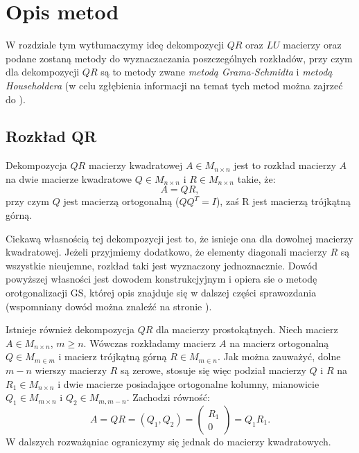 \section{Opis metod}
W rozdziale tym wytłumaczymy ideę dekompozycji $QR$ oraz $LU$ macierzy oraz
podane zostaną metody do wyznaczaczania poszczególnych rozkładów, przy czym dla
dekompozycji $QR$ są to metody zwane \textit{metodą Grama-Schmidta} i
\textit{metodą Householdera} (w celu zgłębienia informacji na temat tych metod można zajrzeć do \cite{NAL}).
\subsection{Rozkład QR}
Dekompozycja $QR$ macierzy kwadratowej $A \in M_{n \times n}$ jest to rozkład
macierzy $A$ na dwie macierze kwadratowe $Q \in M_{n \times n}$ i $R \in M_{n
\times n}$ takie, że:
$$A=QR,$$
przy czym $Q$ jest macierzą ortogonalną ($QQ^T=I$), zaś R jest macierzą trójkątną
górną.

Ciekawą własnością tej dekompozycji jest to, że isnieje ona dla dowolnej
macierzy kwadratowej. Jeżeli przyjmiemy dodatkowo, że elementy diagonali
macierzy $R$ są wszystkie nieujemne, rozkład taki jest wyznaczony jednoznacznie.
Dowód powyższej własności jest dowodem konstrukcjyjnym
i opiera sie o metodę orotgonalizacji GS, której opis znajduje się w
dalszej części sprawozdania (wspomniany dowód można znaleźć na stronie \cite{Dow}).

Istnieje również dekompozycja $QR$ dla macierzy prostokątnych. Niech macierz
$A \in M_{n \times n}$, $m \geq n$. Wówczas rozkładamy macierz $A$ na macierz
ortogonalną $Q \in M_{m \in m}$ i macierz trójkątną górną $R \in M_{m \in n}$.
Jak można zauważyć, dolne $m-n$ wierszy macierzy $R$ są zerowe, stosuje się więc
podział macierzy $Q$ i $R$ na $R_1 \in M_{n \times n}$ i dwie macierze posiadające
ortogonalne kolumny, mianowicie $Q_1 \in M_{m \times n}$ i $Q_2 \in M_{m, m-n}$.
Zachodzi równość:
$$A=QR=(Q_1, Q_2)=\begin{pmatrix} R_1 \\ 0 \end{pmatrix}=Q_1R_1.$$
W dalszych rozważąniac ograniczymy się jednak do macierzy kwadratowych.
